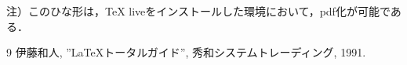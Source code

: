 \documentclass{jarticle}
\begin{document}
注）このひな形は，TeX liveをインストールした環境において，pdf化が可能である．
%

\begin{thebibliography}{9}
伊藤和人, ''\LaTeX トータルガイド'', 秀和システムトレーディング, 1991.
\end{thebibliography}
%
%
\end{document}
